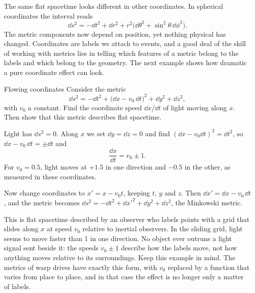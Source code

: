 The same flat spacetime looks different in other coordinates. In spherical
coordinates the interval reads
\begin{equation}
  \dd s^{2} = -\dd t^{2} + \dd r^{2} + r^{2}\bigl(\dd\theta^{2} + \sin^{2}\theta\,\dd\phi^{2}\bigr).
  \label{eq:flat-spherical}
\end{equation}
The metric components now depend on position, yet nothing physical has
changed. Coordinates are labels we attach to events, and a good deal of the
skill of working with metrics lies in telling which features of a metric belong
to the labels and which belong to the geometry. The next example shows how
dramatic a pure coordinate effect can look.

\begin{example}{Flowing coordinates}\label{ex:flow}
Consider the metric
\begin{equation}
  \dd s^{2} = -\dd t^{2} + \bigl(\dd x - v_{0}\,\dd t\bigr)^{2} + \dd y^{2} + \dd z^{2},
  \label{eq:flow-metric}
\end{equation}
with $v_{0}$ a constant. Find the coordinate speed $\dd x/\dd t$ of light moving
along $x$. Then show that this metric describes flat spacetime.

\solution Light has $\dd s^{2} = 0$. Along $x$ we set $\dd y = \dd z = 0$ and find
$(\dd x - v_{0}\dd t)^{2} = \dd t^{2}$, so $\dd x - v_{0}\,\dd t = \pm\dd t$ and
\begin{equation*}
  \frac{\dd x}{\dd t} = v_{0} \pm 1.
\end{equation*}
For $v_{0} = 0.5$, light moves at $+1.5$ in one direction and $-0.5$ in the
other, as measured in these coordinates.

Now change coordinates to $x' = x - v_{0}t$, keeping $t$, $y$ and $z$. Then
$\dd x' = \dd x - v_{0}\,\dd t$, and the metric becomes
$\dd s^{2} = -\dd t^{2} + \dd x'^{2} + \dd y^{2} + \dd z^{2}$, the Minkowski metric.

\discussion This is flat spacetime described by an observer who labels points
with a grid that slides along $x$ at speed $v_{0}$ relative to inertial
observers. In the sliding grid, light seems to move faster than 1 in one
direction. No object ever outruns a light signal sent beside it: the speeds
$v_{0} \pm 1$ describe how the labels move, not how anything moves relative to
its surroundings. Keep this example in mind. The metrics of warp drives have
exactly this form, with $v_{0}$ replaced by a function that varies from place
to place, and in that case the effect is no longer only a matter of labels.
\end{example}

